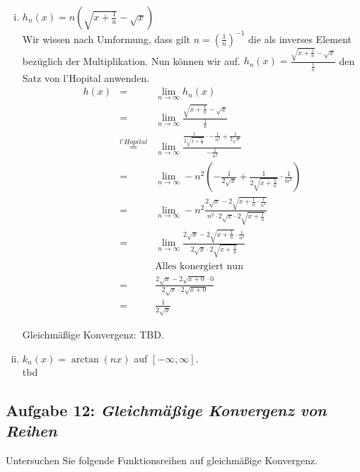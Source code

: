 \documentclass[11pt,a4paper,ngerman]{article}
\newcommand{\limes}[2][n]{\underset{ #1 \rightarrow #2}{\lim}}
\begin{document}
\begin{enumerate}[(i)]
    \item $h_n(x) = n\left( \sqrt{x + \frac{1}{n}} - \sqrt{x} \right)$\\
        Wir wissen nach Umformung, dass gilt $n = \left(\frac{1}{n} \right)^{-1}$ die
        als inverses Element bezüglich der Multiplikation.
        Nun können wir auf.
        $h_n(x) = \frac{\sqrt{x + \frac{1}{n}} - \sqrt{x}}{\frac{1}{n}}$ den Satz von l'Hopital
        anwenden.
        $$\begin{array}{rcl}
            h(x) &=& \limes{\infty} h_n(x)\\
                &=& \limes{\infty} \frac{\sqrt{x + \frac{1}{n}} - \sqrt{x}}{\frac{1}{n}}\\
                &\stackrel{l'Hopital}{=}& 
                    \limes{\infty} \frac{\frac{1}{2\sqrt{x+\frac{1}{n}}}\cdot-\frac{1}{n^2} 
                    + \frac{1}{2\sqrt{x}}}{-\frac{1}{n^2}}\\
                &=& \limes{\infty} -n^2 \left( - \frac{1}{2\sqrt{x}} 
                    + \frac{1}{2\sqrt{x+\frac{1}{n}}} \cdot \frac{1}{n^2}\right)\\
                &=& \limes{\infty} -n^2 \frac{2\sqrt{x} - 2\sqrt{x+\frac{1}{n} \cdot \frac{1}{n^2}}}
                    {n^2 \cdot 2\sqrt{x} \cdot 2\sqrt{x + \frac{1}{n}}}\\
                &=& \limes{\infty} \frac{2\sqrt{x} - 2\sqrt{x+\frac{1}{n}} \cdot \frac{1}{n^2}}
                    {2\sqrt{x} \cdot 2\sqrt{x + \frac{1}{n}}}\\
                && \text{Alles konergiert nun}\\
                &=& \frac{2\sqrt{x} - 2\sqrt{x+0} \cdot 0}{2\sqrt{x} \cdot 2\sqrt{x+0}}\\
                &=& \frac{1}{2\sqrt{x}}
        \end{array}$$ 
         
        Gleichmäßige Konvergenz: TBD.
    \item $k_n(x) = \arctan(nx)$ auf $[-\infty, \infty]$.\\
        tbd
\end{enumerate}

\subsection*{Aufgabe 12: \mdseries\itshape Gleichmäßige Konvergenz von Reihen}

Untersuchen Sie folgende Funktionsreihen auf gleichmäßige Konvergenz.
\end{document}

